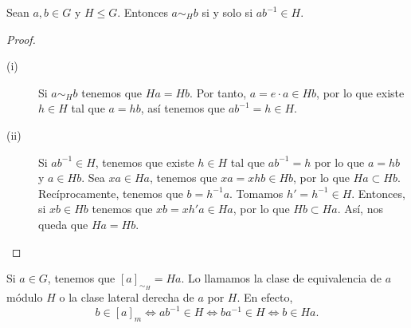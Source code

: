 \begin{lema}
Sean $\displaystyle a,b \in G $ y $\displaystyle H \leq G $. Entonces $\displaystyle a\sim_{H}b $ si y solo si $\displaystyle ab^{-1}\in H $. 
\end{lema}
\begin{proof}
\begin{description}
\item[(i)] Si $\displaystyle a \sim _{H}b $ tenemos que $\displaystyle Ha = Hb $. Por tanto, $\displaystyle a = e \cdot a \in Hb $, por lo que existe $\displaystyle h \in H $ tal que $\displaystyle a = hb $, así tenemos que $\displaystyle ab^{-1} = h \in H $. 
\item[(ii)] Si $\displaystyle ab^{-1} \in H $, tenemos que existe $\displaystyle h \in H $ tal que $\displaystyle ab^{-1} = h $ por lo que $\displaystyle a = hb $ y $\displaystyle a \in Hb $. Sea $\displaystyle xa \in Ha $, tenemos que $\displaystyle xa = xhb \in Hb $, por lo que $\displaystyle Ha \subset Hb $. Recíprocamente, tenemos que $\displaystyle b = h^{-1}a $. Tomamos $\displaystyle h' = h^{-1} \in H $. Entonces, si $\displaystyle xb \in Hb $ tenemos que $\displaystyle xb = xh'a \in Ha $, por lo que $\displaystyle Hb\subset Ha $. Así, nos queda que $\displaystyle Ha = Hb $.
\end{description}
\end{proof}
\begin{observation}
	Si $\displaystyle a \in G $, tenemos que $\displaystyle [a]_{\sim_{H}} = Ha $. Lo llamamos la clase de equivalencia de $\displaystyle a $ módulo $\displaystyle H $ o la clase lateral derecha de $\displaystyle a $ por $\displaystyle H $. En efecto, 
	\[b \in [a]_{m} \iff ab^{-1}\in H  \iff ba^{-1} \in H \iff b \in Ha .\]
\end{observation}

